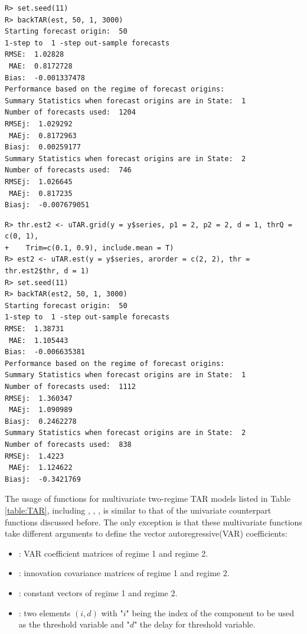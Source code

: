 \begin{verbatim}
R> set.seed(11)
R> backTAR(est, 50, 1, 3000)
Starting forecast origin:  50 
1-step to  1 -step out-sample forecasts 
RMSE:  1.02828 
 MAE:  0.8172728 
Bias:  -0.001337478 
Performance based on the regime of forecast origins:  
Summary Statistics when forecast origins are in State:  1 
Number of forecasts used:  1204 
RMSEj:  1.029292 
 MAEj:  0.8172963 
Biasj:  0.00259177 
Summary Statistics when forecast origins are in State:  2 
Number of forecasts used:  746 
RMSEj:  1.026645 
 MAEj:  0.817235 
Biasj:  -0.007679051 
\end{verbatim}
\begin{verbatim}
R> thr.est2 <- uTAR.grid(y = y$series, p1 = 2, p2 = 2, d = 1, thrQ = c(0, 1),
+    Trim=c(0.1, 0.9), include.mean = T)
R> est2 <- uTAR.est(y = y$series, arorder = c(2, 2), thr = thr.est2$thr, d = 1)
R> set.seed(11)
R> backTAR(est2, 50, 1, 3000)
Starting forecast origin:  50 
1-step to  1 -step out-sample forecasts 
RMSE:  1.38731 
 MAE:  1.105443 
Bias:  -0.006635381 
Performance based on the regime of forecast origins:  
Summary Statistics when forecast origins are in State:  1 
Number of forecasts used:  1112 
RMSEj:  1.360347 
 MAEj:  1.090989 
Biasj:  0.2462278 
Summary Statistics when forecast origins are in State:  2 
Number of forecasts used:  838 
RMSEj:  1.4223 
 MAEj:  1.124622 
Biasj:  -0.3421769 
\end{verbatim}

The usage of functions for multivariate two-regime TAR models listed in Table \ref{table:TAR}, including , , ,  is similar to that of the univariate
counterpart functions discussed before. The only exception is that these multivariate functions
take different arguments to define the vector autoregressive(VAR) coefficients:
\begin{itemize}\setlength\itemsep{-0.3em}
\item {}: VAR coefficient matrices of regime 1 and regime 2.
\item {}: innovation covariance matrices of regime 1 and regime 2.
\item {}: constant vectors of regime 1 and regime 2.
\item {}: two elements $(i,d)$ with "$i$" being the index of the component to be used as the threshold variable and "$d$" the delay for threshold variable. %
\end{itemize}



